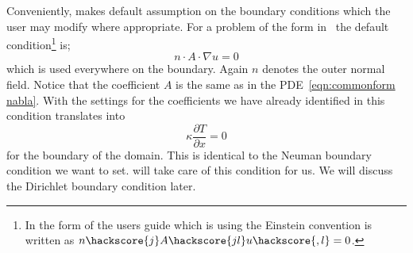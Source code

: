 Conveniently, \esc makes default assumption on the boundary conditions which the user may modify where appropriate. 
For a problem of the form in~ the default condition\footnote{In the form of the \esc users guide which is using the Einstein convention is written as 
$n\hackscore{j}A\hackscore{jl} u\hackscore{,l}=0$.} is;
\begin{equation}\label{NEUMAN 2}
n\cdot A \cdot\nabla u = 0 
\end{equation}
which is used everywhere on the boundary. Again $n$ denotes the outer normal field. 
Notice that the coefficient $A$ is the same as in the \esc PDE~\ref{eqn:commonform nabla}. 
With the settings for the coefficients we have already identified in  this
condition translates into 
\begin{equation}\label{NEUMAN 2b}
\kappa \frac{\partial T}{\partial x} = 0 
\end{equation}
for the boundary of the domain. This is identical to the Neuman boundary condition we want to set. \esc will take care of this condition for us. We will discuss the Dirichlet boundary condition later.


